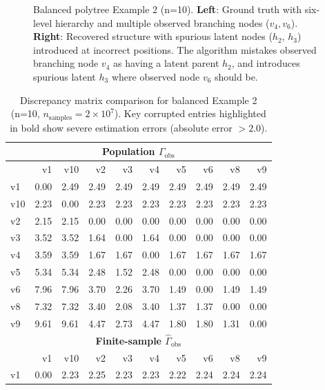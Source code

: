 \documentclass[11pt,a4paper]{article}
\numberwithin{equation}{section}
\begin{document}
\begin{figure}[h]
\caption{Balanced polytree Example 2 (n=10). \textbf{Left}: Ground truth with six-level hierarchy and multiple observed branching nodes ($v_4, v_6$). \textbf{Right}: Recovered structure with spurious latent nodes ($h_2$, $h_3$) introduced at incorrect positions. The algorithm mistakes observed branching node $v_4$ as having a latent parent $h_2$, and introduces spurious latent $h_3$ where observed node $v_6$ should be.}
\label{fig:balanced_example2}
\end{figure}

\begin{table}[h]
\centering
\caption{Discrepancy matrix comparison for balanced Example 2 (n=10, $n_{\text{samples}} = 2 \times 10^7$). Key corrupted entries highlighted in bold show severe estimation errors (absolute error $> 2.0$).}
\label{tab:balanced_example2}
\small
\begin{tabular}{l|rrrrrrrrr}
\toprule
\multicolumn{10}{c}{\textbf{Population $\Gamma_{\text{obs}}$}} \\
\midrule
& v1 & v10 & v2 & v3 & v4 & v5 & v6 & v8 & v9 \\
\midrule
v1 & 0.00 & 2.49 & 2.49 & 2.49 & 2.49 & 2.49 & 2.49 & 2.49 & 2.49 \\
v10 & 2.23 & 0.00 & 2.23 & 2.23 & 2.23 & 2.23 & 2.23 & 2.23 & 2.23 \\
v2 & 2.15 & 2.15 & 0.00 & 0.00 & 0.00 & 0.00 & 0.00 & 0.00 & 0.00 \\
v3 & 3.52 & 3.52 & 1.64 & 0.00 & 1.64 & 0.00 & 0.00 & 0.00 & 0.00 \\
v4 & 3.59 & 3.59 & 1.67 & 1.67 & 0.00 & 1.67 & 1.67 & 1.67 & 1.67 \\
v5 & 5.34 & 5.34 & 2.48 & 1.52 & 2.48 & 0.00 & 0.00 & 0.00 & 0.00 \\
v6 & 7.96 & 7.96 & 3.70 & 2.26 & 3.70 & 1.49 & 0.00 & 1.49 & 1.49 \\
v8 & 7.32 & 7.32 & 3.40 & 2.08 & 3.40 & 1.37 & 1.37 & 0.00 & 0.00 \\
v9 & 9.61 & 9.61 & 4.47 & 2.73 & 4.47 & 1.80 & 1.80 & 1.31 & 0.00 \\
\midrule[1.5pt]
\multicolumn{10}{c}{\textbf{Finite-sample $\hat{\Gamma}_{\text{obs}}$}} \\
\midrule
& v1 & v10 & v2 & v3 & v4 & v5 & v6 & v8 & v9 \\
\midrule
v1 & 0.00 & 2.23 & 2.25 & 2.23 & 2.23 & 2.22 & 2.24 & 2.24 & 2.24 \\

\end{tabular}
\end{table}
\end{document}
